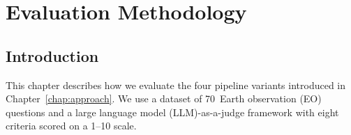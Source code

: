 \chapter{Evaluation Methodology}
\label{chap:evaluation}

\section{Introduction}
\label{sec:eval-intro}

This chapter describes how we evaluate the four pipeline variants introduced in Chapter~\ref{chap:approach}. We use a dataset of 70~Earth observation (EO) questions and a large language model (LLM)-as-a-judge framework with eight criteria scored on a 1--10 scale.


